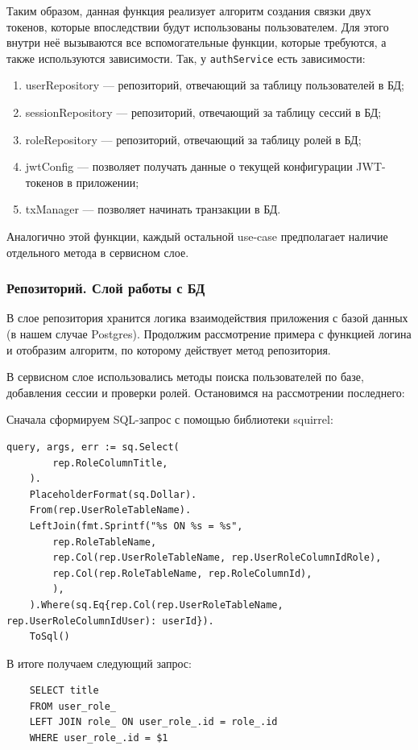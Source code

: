 \documentclass[diploma]{SCWorks}
\begin{document}
Таким образом, данная функция реализует алгоритм создания связки двух токенов,
которые впоследствии будут использованы пользователем. Для этого внутри неё
вызываются все вспомогательные функции, которые требуются, а также используются
зависимости. Так, у \texttt{authService} есть зависимости:
\begin{enumerate}
    \item userRepository — репозиторий, отвечающий за таблицу пользователей в БД;
	\item sessionRepository — репозиторий, отвечающий за таблицу сессий в БД;
	\item roleRepository — репозиторий, отвечающий за таблицу ролей в БД;
	\item jwtConfig — позволяет получать данные о текущей конфигурации
    JWT-токенов в приложении;
	\item txManager — позволяет начинать транзакции в БД.
\end{enumerate}

Аналогично этой функции, каждый остальной use-case предполагает наличие 
отдельного метода в сервисном слое. 

\subsubsection{Репозиторий. Слой работы с БД}

В слое репозитория хранится логика взаимодействия приложения с базой данных 
(в нашем случае Postgres). Продолжим рассмотрение примера с функцией логина
и отобразим алгоритм, по которому действует метод репозитория.

В сервисном слое использовались методы поиска пользователей по базе, 
добавления сессии и проверки ролей. Остановимся на рассмотрении последнего:

Сначала сформируем SQL-запрос с помощью библиотеки squirrel:
\begin{verbatim}
query, args, err := sq.Select(
        rep.RoleColumnTitle,
    ).
    PlaceholderFormat(sq.Dollar).
    From(rep.UserRoleTableName).
    LeftJoin(fmt.Sprintf("%s ON %s = %s",
        rep.RoleTableName,
        rep.Col(rep.UserRoleTableName, rep.UserRoleColumnIdRole),
        rep.Col(rep.RoleTableName, rep.RoleColumnId),
        ),
    ).Where(sq.Eq{rep.Col(rep.UserRoleTableName, rep.UserRoleColumnIdUser): userId}).
    ToSql()
\end{verbatim}

В итоге получаем следующий запрос:
\begin{verbatim}
    SELECT title 
    FROM user_role_
    LEFT JOIN role_ ON user_role_.id = role_.id
    WHERE user_role_.id = $1
\end{verbatim}
\end{document}
